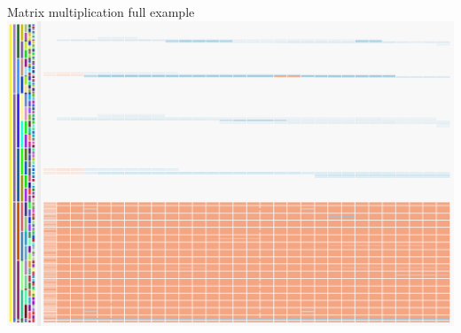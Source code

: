 \documentclass[xcolor={usenames,dvipsnames},hyperref={pdfusetitle}]{beamer}
\begin{document}
\begin{frame}{Matrix multiplication full example}
{{{{                }{
                    \includegraphics[width=\textwidth]{ocelotl/Sharing-zoom.png}
                }
            }
        }
    }
    \pause
    \pause
    \pause
    \pause
\end{frame}%
\setcounter{framenumber}{\value{finalframe}}
\end{document}
